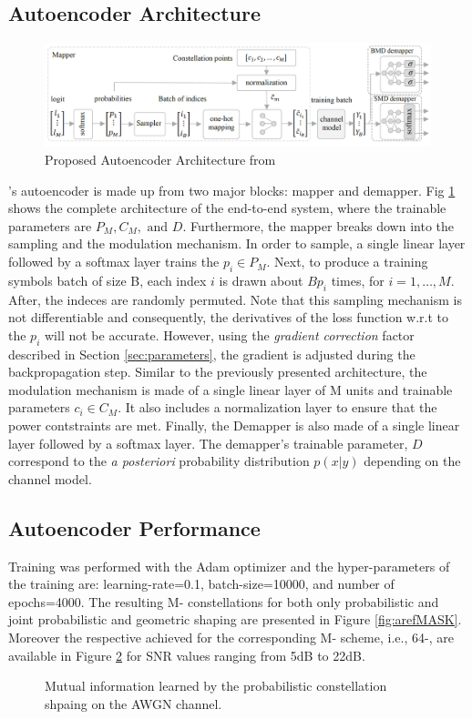 \subsection{Autoencoder Architecture}
\begin{figure}[H]
	\centering
	\includegraphics[width=\textwidth]{figs/aref_diagram.png}
	\caption{Proposed Autoencoder Architecture from \cite{Aref}}
	\label{fig:arefAe}
\end{figure}

\citeauthor{Aref}'s autoencoder is made up from two major blocks: mapper and demapper. Fig \ref{fig:arefAe} shows the complete architecture of the end-to-end system, where the trainable parameters are  $P_M, C_M, \text{ and } D$. Furthermore, the mapper breaks down into the sampling and the modulation mechanism. In order to sample, a single linear layer followed by a softmax layer trains the $p_i \in P_M$. Next, to produce a training symbols batch of size B, each index $i$ is drawn about $Bp_i$ times, for $i = 1, \dots, M$. After, the indeces are randomly permuted. Note that this sampling mechanism is not differentiable and consequently, the derivatives of the loss function w.r.t to the $p_i$ will not be accurate. However, using the \textit{gradient correction} factor described in Section \ref{sec:parameters}, the gradient is adjusted during the backpropagation step. Similar to the previously presented architecture, the modulation mechanism is made of a single linear layer of M units and trainable parameters $c_i \in C_M$. It also includes a normalization layer to ensure that the power contstraints are met. Finally, the Demapper is also made of a single linear layer followed by a softmax layer. The demapper's trainable parameter, $D$ correspond to the \textit{a posteriori} probability distribution $p(x|y)$ depending on the channel model.

\subsection{Autoencoder Performance}
Training was performed with the Adam optimizer and the hyper-parameters of the training are: learning-rate=0.1, batch-size=10000, and number of epochs=4000.
The resulting M- constellations for both only probabilistic and joint probabilistic and geometric shaping are presented in Figure \ref{fig:arefMASK}. Moreover the respective achieved  for the corresponding M- scheme, i.e., 64-, are available in Figure \ref{fig:arefPerf} for SNR values ranging from 5dB to 22dB.

\begin{figure}
	
	\caption{Mutual information learned by the probabilistic constellation shpaing on the AWGN channel.}
	\label{fig:arefPerf}
\end{figure}

